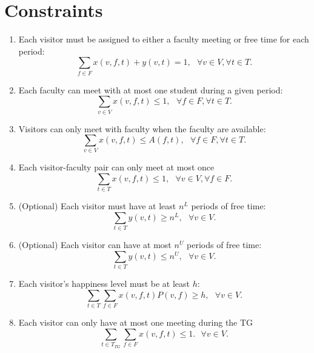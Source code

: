 \documentclass[12pt]{article}
\theoremstyle{definition}
\newtheorem{definition set}{Definition Set}%
\newtheorem{problem statement}{Problem Statement} %
\theoremstyle{remark}
\theoremstyle{remark}
\begin{document}
\section{Constraints}
\begin{enumerate}
\item
Each visitor must be assigned to either a faculty meeting or free time for each period:
\begin{equation}
\sum_{f \in F} x(v,f,t) + y(v,t) = 1, \ \ \ \forall v \in V, \forall t \in T.
\end{equation}

\item
Each faculty can meet with at most one student during a given period:
\begin{equation}
\sum_{v \in V} x(v,f,t) \leq 1, \ \ \ \forall f \in F, \forall t \in T.
\end{equation}

\item
Visitors can only meet with faculty when the faculty are available:
\begin{equation}
\sum_{v \in V} x(v,f,t) \leq A(f,t), \ \ \ \forall f \in F, \forall t \in T.
\end{equation}

\item
Each visitor-faculty pair can only meet at most once
\begin{equation}
\sum_{t \in T} x(v,f,t) \leq 1, \ \ \ \forall v \in V, \forall f \in F.
\end{equation}

\item (Optional) Each visitor must have at least $n^L$ periods of free time:
\begin{equation}
\sum_{t \in T} y(v,t) \geq n^L, \ \ \ \forall v \in V.
\end{equation}

\item (Optional) Each visitor can have at most $n^U$ periods of free time:
\begin{equation}
\sum_{t \in T} y(v,t) \leq n^U, \ \ \ \forall v \in V.
\end{equation}

\item 
Each visitor\rq{}s happiness level must be at least $h$:
\begin{equation}
\sum_{t \in T} \sum_{f \in F} x(v,f,t) P(v,f) \geq h, \ \ \ \forall v \in V.
\end{equation}

\item 
Each visitor can only have at most one meeting during the TG
\begin{equation}
\sum_{t \in T_{TG}} \sum_{f \in F} x(v,f,t) \leq 1. \ \ \ \forall v \in V.
\end{equation}
\end{enumerate}
\end{document}
